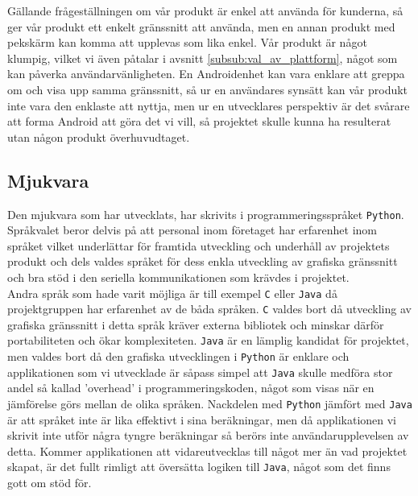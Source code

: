 \documentclass{article}
\begin{document}
            \noindent Gällande frågeställningen om vår produkt är enkel att använda för kunderna, så ger vår produkt ett enkelt gränssnitt att använda, men en annan produkt med pekskärm kan komma att upplevas som lika enkel. Vår produkt är något klumpig, vilket vi även påtalar i avsnitt \ref{subsub:val_av_plattform}, något som kan påverka användarvänligheten. En Androidenhet kan vara enklare att greppa om och visa upp samma gränssnitt, så ur en användares synsätt kan vår produkt inte vara den enklaste att nyttja, men ur en utvecklares perspektiv är det svårare att forma Android att göra det vi vill, så projektet skulle kunna ha resulterat utan någon produkt överhuvudtaget.


        \subsection{Mjukvara} %
        \label{sub:d_mjukvara}

            Den mjukvara som har utvecklats, har skrivits i programmeringsspråket \texttt{Python}. Språk\-valet beror delvis på att personal inom företaget har erfarenhet inom språket vilket underlättar för framtida utveckling och underhåll av projektets produkt och dels valdes språket för dess enkla utveckling av grafiska gränssnitt och bra stöd i den seriella kommunikationen som krävdes i projektet. \\

            \noindent Andra språk som hade varit möjliga är till exempel \texttt{C} eller \texttt{Java} då projektgruppen har erfarenhet av de båda språken. \texttt{C} valdes bort då utveckling av grafiska gränssnitt i detta språk kräver externa bibliotek och minskar därför portabiliteten och ökar komplexiteten. \texttt{Java} är en lämplig kandidat för projektet, men valdes bort då den grafiska utvecklingen i \texttt{Python} är enklare och applikationen som vi utvecklade är såpass simpel att \texttt{Java} skulle medföra stor andel så kallad 'overhead' i programmeringskoden, något som visas när en jämförelse görs mellan de olika språken.\cite{Ferg}  Nackdelen med \texttt{Python} jämfört med \texttt{Java} är att språket inte är lika effektivt i sina beräkningar, men då applikationen vi skrivit inte utför några tyngre beräkningar så berörs inte användar\-upplevelsen  av detta. Kommer applikationen att vidareutvecklas till något mer än vad projektet skapat, är det fullt rimligt att översätta logiken till \texttt{Java}, något som det finns gott om stöd för.\cite{jython}
        
\end{document}
